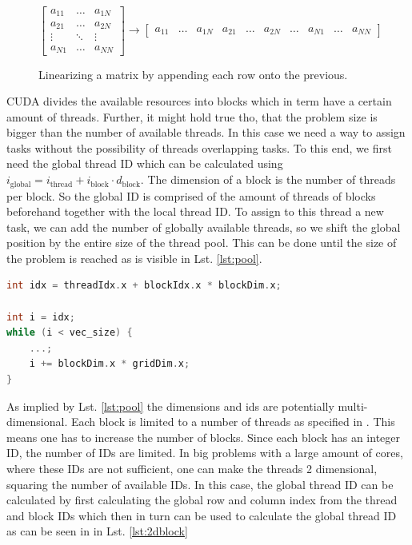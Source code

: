 \documentclass{article}
\begin{document}
\begin{figure}
    \centering
    \begin{equation*}
        \begin{bmatrix}
            a_{11} & \dots & a_{1N} \\
            a_{21} & \dots & a_{2N} \\
            \vdots & \ddots & \vdots \\
            a_{N1} & \dots & a_{NN}
        \end{bmatrix} \xrightarrow{} 
        \begin{bmatrix}
            a_{11} & \dots & a_{1N} &
            a_{21} & \dots & a_{2N} &
            \dots &
            a_{N1} & \dots & a_{NN}
        \end{bmatrix}
    \end{equation*}
    \caption{Linearizing a matrix by appending each row onto the previous.}
    \label{fig:mat_lin}
\end{figure}

CUDA divides the available resources into blocks which in term have a certain amount of threads. Further, it might hold true tho, that the problem size is bigger than the number of available threads. In this case we need a way to assign tasks without the possibility of threads overlapping tasks. To this end, we first need the global thread ID which can be calculated using $i_{\text{global}} = i_{\text{thread}} + i_{\text{block}} \cdot d_{\text{block}}$. The dimension of a block is the number of threads per block. So the global ID is comprised of the amount of threads of blocks beforehand together with the local thread ID. To assign to this thread a new task, we can add the number of globally available threads, so we shift the global position by the entire size of the thread pool. This can be done until the size of the problem is reached as is visible in Lst. \ref{lst:pool}.

\begin{lstlisting}[mathescape=true, language=C++, caption=Assignment of threads when the problem size is bigger than the available pool. $\label{lst:pool}$]
int idx = threadIdx.x + blockIdx.x * blockDim.x;

int i = idx;
while (i < vec_size) {
    ...;
    i += blockDim.x * gridDim.x;
}
\end{lstlisting}

As implied by Lst. \ref{lst:pool} the dimensions and ids are potentially multi-dimensional. Each block is limited to a number of threads as specified in \cite{cuda2026}. This means one has to increase the number of blocks. Since each block has an integer ID, the number of IDs are limited. In big problems with a large amount of cores, where these IDs are not sufficient, one can make the threads 2 dimensional, squaring the number of available IDs. In this case, the global thread ID can be calculated by first calculating the global row and column index from the thread and block IDs which then in turn can be used to calculate the global thread ID as can be seen in in Lst. \ref{lst:2dblock}
\end{document}
